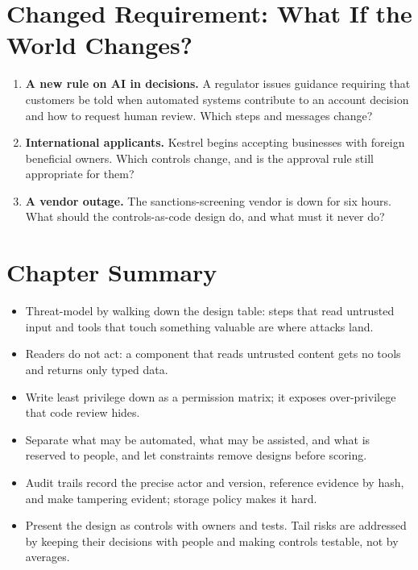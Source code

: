 \section{Changed Requirement: What If the World Changes?}
\label{sec:kyc-changed}

\begin{enumerate}[itemsep=3pt]
  \item \textbf{A new rule on AI in decisions.} A regulator issues guidance requiring that customers be told when automated systems contribute to an account decision and how to request human review. Which steps and messages change?
  \item \textbf{International applicants.} Kestrel begins accepting businesses with foreign beneficial owners. Which controls change, and is the approval rule still appropriate for them?
  \item \textbf{A vendor outage.} The sanctions-screening vendor is down for six hours. What should the controls-as-code design do, and what must it never do?
\end{enumerate}

\section*{Chapter Summary}

\begin{itemize}[itemsep=2pt]
  \item Threat-model by walking down the design table: steps that read untrusted input and tools that touch something valuable are where attacks land.
  \item Readers do not act: a component that reads untrusted content gets no tools and returns only typed data.
  \item Write least privilege down as a permission matrix; it exposes over-privilege that code review hides.
  \item Separate what may be automated, what may be assisted, and what is reserved to people, and let constraints remove designs before scoring.
  \item Audit trails record the precise actor and version, reference evidence by hash, and make tampering evident; storage policy makes it hard.
  \item Present the design as controls with owners and tests. Tail risks are addressed by keeping their decisions with people and making controls testable, not by averages.
\end{itemize}

